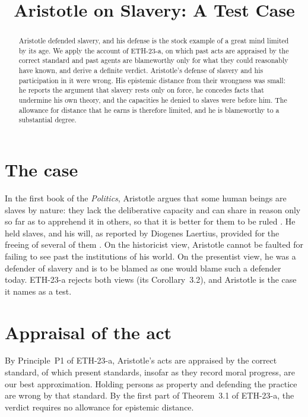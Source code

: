 \documentclass{situationist-preprint}
\title{Aristotle on Slavery: A Test Case}
\begin{document}
\maketitle

\begin{abstract}
Aristotle defended slavery, and his defense is the stock example of a great mind limited by its age. We apply the account of ETH-23-a, on which past acts are appraised by the correct standard and past agents are blameworthy only for what they could reasonably have known, and derive a definite verdict. Aristotle's defense of slavery and his participation in it were wrong. His epistemic distance from their wrongness was small: he reports the argument that slavery rests only on force, he concedes facts that undermine his own theory, and the capacities he denied to slaves were before him. The allowance for distance that he earns is therefore limited, and he is blameworthy to a substantial degree.
\end{abstract}

\section{The case}

In the first book of the \emph{Politics}, Aristotle argues that some human beings are slaves by nature: they lack the deliberative capacity and can share in reason only so far as to apprehend it in others, so that it is better for them to be ruled \citep[I.4--I.5, I.13]{AristotlePol}. He held slaves, and his will, as reported by Diogenes Laertius, provided for the freeing of several of them \citep[V.11--16]{DiogenesLaertius}. On the historicist view, Aristotle cannot be faulted for failing to see past the institutions of his world. On the presentist view, he was a defender of slavery and is to be blamed as one would blame such a defender today. ETH-23-a rejects both views (its Corollary~3.2), and Aristotle is the case it names as a test.

\section{Appraisal of the act}

By Principle~P1 of ETH-23-a, Aristotle's acts are appraised by the correct standard, of which present standards, insofar as they record moral progress, are our best approximation. Holding persons as property and defending the practice are wrong by that standard. By the first part of Theorem~3.1 of ETH-23-a, the verdict requires no allowance for epistemic distance.
\end{document}
